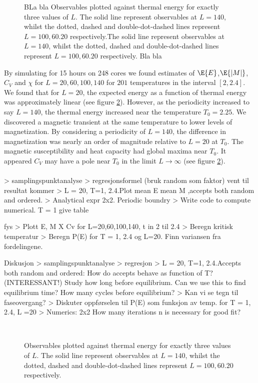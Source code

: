 \documentclass[11pt,english,a4paper]{article}
\begin{document}
\begin{figure}
\center

\caption{BLa bla Observables plotted against thermal energy for exactly three values of $L$. The solid line represent observables at $L=140$, whilst the dotted, dashed and double-dot-dashed lines represent $L = 100,60.20$ respectively.The solid line represent observables at $L=140$, whilst the dotted, dashed and double-dot-dashed lines represent $L = 100,60.20$ respectively. Bla bla} \label{fig:signlerun}
\end{figure}%
By simulating for 15 hours on 248 cores we found estimates of $\E{E}$,$\E{|M|}$,$C_V$ and $\chi$ for $L=20,60,100,140$ for $201$ temperatures in the interval $[2,2.4]$. We found that for $L=20$, the expected energy as a function of thermal energy was approximately linear (see figure \ref{fig:observables}). However, as the periodicity increased to say $L=140$, the thermal energy increased near the temperature $T_0=2.25$. We discovered a magnetic transient at the same temperature to lower levels of magnetization. By considering a periodicity of $L=140$, the difference in magnetization was nearly an order of magnitude relative to $L=20$ at $T_0$. The magnetic susceptibility and heat capacity had global maxima near $T_0$. It appeared $C_V$ may have a pole near $T_0$ in the limit $L \to \infty$ (see figure \ref{fig:observables}).\\
\\


> samplingspunktanalyse
> regresjonsformel (bruk random som faktor) vent til resultat kommer
> L = 20, T=1, 2.4.Plot mean E mean M ,accepts both random and ordered.
> Analytical expr 2x2. Periodic boundry
> Write code to compute numerical. T = 1 give table


fys
> Plott E, M X Cv for L=20,60,100,140, t in 2 til 2.4
> Beregn kritisk temperatur
> Beregn P(E) for T = 1, 2.4 og L=20. Finn variansen fra fordelingene. 

Diskusjon
> samplingspunktanalyse
> regresjon
> L = 20, T=1, 2.4.Accepts both random and ordered: How do accepts behave as function of T? (INTERESSANT!) Study how long before equilibrium. Can we use this to find equilibrium time?  How many cycles before equilibrium?
> Kan vi se tegn til faseovergang?
> Diskuter oppførselen til P(E) som funksjon av temp. for T = 1, 2.4, L =20
> Numerics: 2x2 How many iterations n is necessary for good fit? 




\begin{figure}
\center
\\

\caption{Observables plotted against thermal energy for exactly three values of $L$. The solid line represent observables at $L=140$, whilst the dotted, dashed and double-dot-dashed lines represent $L = 100,60.20$ respectively.} \label{fig:observables}
\end{figure}
\end{document}
